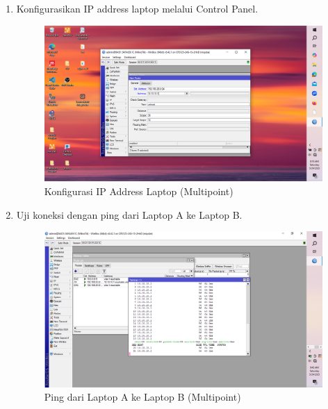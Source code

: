 \begin{enumerate}
    \item Konfigurasikan IP address laptop melalui Control Panel.
    \begin{figure}[H]
        \centering
        \includegraphics[width=0.5\linewidth]{gambar5.png}
        \caption{Konfigurasi IP Address Laptop (Multipoint)}
        \label{fig:ip-laptop-multi}
    \end{figure}

    \item Uji koneksi dengan ping dari Laptop A ke Laptop B.
    \begin{figure}[H]
        \centering
        \includegraphics[width=0.5\linewidth]{ping2.png}
        \caption{Ping dari Laptop A ke Laptop B (Multipoint)}
        \label{fig:ping-multi}
    \end{figure}
\end{enumerate}


